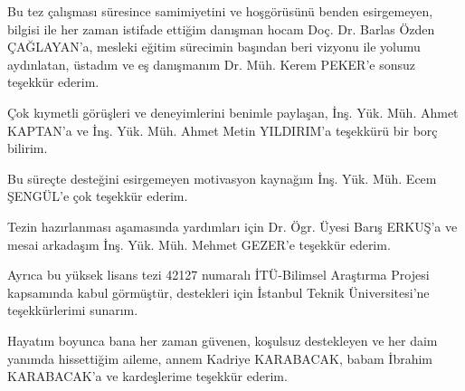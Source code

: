 Bu tez çalışması süresince samimiyetini ve hoşgörüsünü benden esirgemeyen,
bilgisi ile her zaman istifade ettiğim danışman hocam Doç. Dr. Barlas
Özden ÇAĞLAYAN’a, mesleki eğitim sürecimin başından beri vizyonu ile
yolumu aydınlatan, üstadım ve eş danışmanım Dr. Müh. Kerem PEKER’e
sonsuz teşekkür ederim.

Çok kıymetli görüşleri ve deneyimlerini benimle paylaşan, İnş. Yük.
Müh. Ahmet KAPTAN’a ve İnş. Yük. Müh. Ahmet Metin YILDIRIM’a teşekkürü
bir borç bilirim.

Bu süreçte desteğini esirgemeyen motivasyon kaynağım İnş. Yük. Müh.
Ecem ŞENGÜL’e çok teşekkür ederim. 

Tezin hazırlanması aşamasında yardımları için Dr. Ögr. Üyesi Barış
ERKUŞ’a ve mesai arkadaşım İnş. Yük. Müh. Mehmet GEZER’e teşekkür
ederim.

Ayrıca bu yüksek lisans tezi 42127 numaralı İTÜ-Bilimsel Araştırma
Projesi kapsamında kabul görmüştür, destekleri için İstanbul Teknik
Üniversitesi’ne teşekkürlerimi sunarım.

Hayatım boyunca bana her zaman güvenen, koşulsuz destekleyen ve her
daim yanımda hissettiğim aileme, annem Kadriye KARABACAK, babam İbrahim
KARABACAK’a ve kardeşlerime teşekkür ederim.